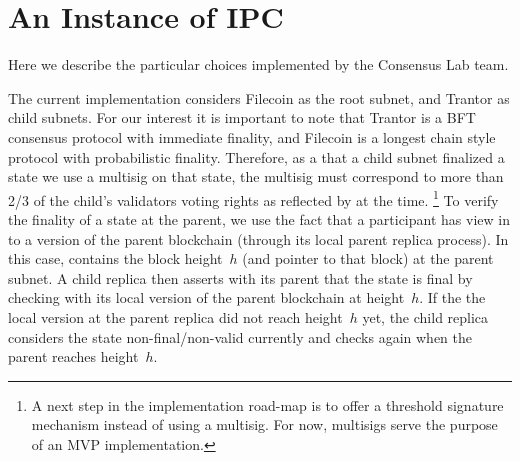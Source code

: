  \section{An Instance of IPC}
 \label{sec:impl-tmpl}
 Here we describe the particular choices implemented by the Consensus Lab team.

The current implementation considers Filecoin as the root subnet, and Trantor as child subnets. For our interest it is important to note that Trantor is a BFT consensus protocol with immediate finality, and Filecoin is a longest chain style protocol with probabilistic finality. Therefore, as a \prf that a child subnet finalized a state we use a multisig on that state, the multisig must correspond to more than 2/3 of the child's validators voting rights as reflected by \sa at the time.%
\footnote{A next step in the implementation road-map is to offer a threshold signature mechanism instead of using a multisig. For now, multisigs serve the purpose of an MVP implementation.}
To verify the finality of a state at the parent, we use the fact that a participant has view in to a version of the parent blockchain (through its local parent replica process). In this case, \prf contains the block height~$h$ (and pointer to that block) at the parent subnet. A child replica then asserts with its parent that the state is final by checking with its local version of the parent blockchain at height~$h$. If the the local version at the parent replica did not reach height~$h$ yet, the child replica considers the state non-final/non-valid currently and checks again when the parent reaches height~$h$.